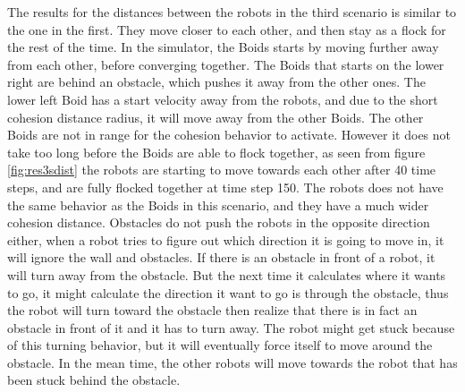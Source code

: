 The results for the distances between the robots in the third scenario is similar to the one in the first. They move closer to each other, and then stay as a flock for the rest of the time. In the simulator, the Boids starts by moving further away from each other, before converging together.
The Boids that starts on the lower right are behind an obstacle, which pushes it away from the other ones. The lower left Boid has a start velocity away from the robots, and due to the short cohesion distance radius, it will move away from the other Boids. The other Boids are not in range for the cohesion behavior to activate.
However it does not take too long before the Boids are able to flock together, as seen from figure \ref{fig:res3sdist} the robots are starting to move towards each other after 40 time steps, and are fully flocked together at time step 150. 
The robots does not have the same behavior as the Boids in this scenario, and they have a much wider cohesion distance. Obstacles do not push the robots in the opposite direction either, when a robot tries to figure out which direction it is going to move in, it will ignore the wall and obstacles. If there is an obstacle in front of a robot, it will turn away from the obstacle. But the next time it calculates where it wants to go, it might calculate the direction it want to go is through the obstacle, thus the robot will turn toward the obstacle then realize that there is in fact an obstacle in front of it and it has to turn away. The robot might get stuck because of this turning behavior, but it will eventually force itself to move around the obstacle. In the mean time, the other robots will move towards the robot that has been stuck behind the obstacle.


